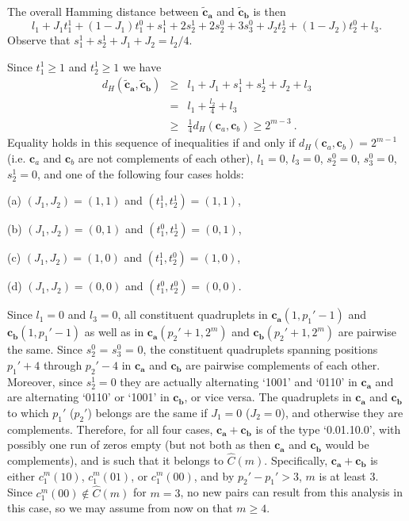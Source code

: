 The overall Hamming distance between $\mathbf{\tilde{c}_a}$ and
$\mathbf{\tilde{c}_b}$ is then
\[l_1+J_1t_1^1+(1-J_1)t_1^0+s_{1}^1+2s_{2}^1+2s_{2}^0+3
s_{3}^0+J_2t_2^1+(1-J_2)t_2^0+l_3.\] Observe that
$s_{1}^1+s_{2}^1+J_1+J_2=l_2/4$.

Since $t_{1}^1 \ge 1$ and $t_{2}^1 \ge 1$ we have
\begin{eqnarray*}
d_H(\mathbf{\tilde{c}_a}, \mathbf{\tilde{c}_b}) &\ge&
l_1 + J_1 + s_{1}^1 + s_{2}^1 + J_2 + l_3\\
&=& l_1 + \frac{l_2}{4} + l_3\\
&\ge& \frac{1}{4} d_H(\mathbf{c}_a, \mathbf{c}_b) \ge 2^{m-3}~.
\end{eqnarray*}
Equality holds in this sequence of inequalities if and only if
$d_H(\mathbf{c}_a, \mathbf{c}_b) = 2^{m-1}$ (i.e.
$\mathbf{c}_a$ and $\mathbf{c}_b$ are not complements of each other),
$l_1 = 0$, $l_3 =0$, $s_{2}^0 = 0$, $s_{3}^0 = 0$, $s_{2}^1 = 0$,
and one of the following four cases holds:

(a) $(J_1, J_2) = (1, 1)$ and $(t_{1}^1, t_{2}^1) = (1, 1)$,

(b) $(J_1, J_2) = (0, 1)$ and $(t_{1}^0, t_{2}^1) = (0, 1)$,

(c) $(J_1, J_2) = (1, 0)$ and $(t_{1}^1, t_{2}^0) = (1, 0)$,

(d) $(J_1, J_2) = (0, 0)$ and $(t_{1}^0, t_{2}^0) = (0, 0)$.


Since $l_1=0$ and $l_3=0$, all constituent quadruplets in
$\mathbf{c_a}(1,p_1'-1)$ and $\mathbf{c_b}(1,p_1'-1)$ as well as
in $\mathbf{c_a}(p_2'+1,2^m)$ and $\mathbf{c_b}(p_2'+1,2^m)$ are
pairwise the same. Since $s_{2}^0$ = $s_{3}^0$ = $0$, the
constituent quadruplets spanning positions $p_1'+4$ through
$p_2'-4$ in $\mathbf{c_a}$ and $\mathbf{c_b}$ are pairwise
complements of each other. Moreover, since $s_2^1=0$ they are
actually alternating `1001' and `0110' in $\mathbf{c_a}$ and are
alternating `0110' or `1001' in $\mathbf{c_b}$, or vice versa. The
quadruplets in $\mathbf{c_a}$ and $\mathbf{c_b}$ to which $p_1'$
($p_2'$) belongs are the same if $J_1=0$ ($J_2=0$), and otherwise
they are complements. Therefore, for all four cases,
$\mathbf{c_a}+\mathbf{c_b}$ is of the type `0.01.10.0', with
possibly one run of zeros empty (but not both as then
$\mathbf{c_a}$ and $\mathbf{c_b}$ would be complements), and is
such that it belongs to $\hat{C}(m)$. Specifically,
$\mathbf{c_a}+\mathbf{c_b}$ is either $c_1^m(10)$, $c_1^m(01)$, or
$c_1^m(00)$, and by $p_2'-p_1'>3$, $m$ is at least 3. Since
$c_1^m(00) \notin \hat{C}(m)$ for $m =3$, no new pairs can result
from this analysis in this case, so we may assume from now on that
$m \ge 4$.

